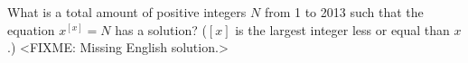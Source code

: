 \problem
What is a total amount of positive integers $N$ from 1 to 2013 such that
the equation $x^{[x]}=N$ has a solution?
($[x]$ is the largest integer less or equal than $x$.)
\solution
<FIXME: Missing English solution.>
\endproblem
